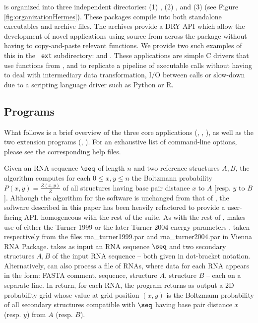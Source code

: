 \hermes is organized into three independent directories: (1)
\ffttwo, (2) \rnamfpt, and (3) \rnaeq (see
Figure \ref{fig:organizationHermes}). These packages compile into both
standalone executables and archive files. The archives provide a DRY
API which allow the development of novel applications using source
from across the \hermes package without having to copy-and-paste
relevant functions. We provide two such examples of this in the {\tt
ext} subdirectory: \fftmfpt and \ffteq. These applications
are simple C drivers that use functions from \ffttwo, \rnamfpt and
\rnaeq to replicate a pipeline of executable calls without having to
deal with intermediary data transformation, I/O between calls or
slow-down due to a scripting language driver such as Python or R.

\subsection{Programs}

What follows is a brief overview of the three core applications
(\ffttwo, \rnamfpt, \rnaeq), as well as the two extension
programs (\fftmfpt, \ffteq). For an exhaustive list of
command-line options, please see the corresponding help files.

Given an RNA sequence $\seq$ of length $n$ and two reference
structures $A,B$, the algorithm \ffttwo \cite{Senter.jmb14}
computes for each $0 \leq x,y \leq n$ the Boltzmann probability
$P(x,y) = \frac{Z(x,y)}{Z}$ of all structures having base pair
distance $x$ to $A$ [resp. $y$ to $B$]. Although the algorithm for the
software \ffttwo is unchanged from that of \cite{Senter.jmb14},
the software described in this
paper has been heavily refactored to provide a user-facing API,
homogeneous with the rest of the \hermes suite. As with the rest of
\hermes, \ffttwo makes use of either the Turner 1999 \cite{turner}
or the later Turner 2004 energy parameters
\cite{Turner.nar10}, taken respectively
from the files rna\_turner1999.par and  rna\_turner2004.par in Vienna
RNA Package. \ffttwo takes as input an RNA sequence $\seq$ and two
secondary structures $A,B$ of the input RNA sequence -- both given
in dot-bracket
notation. Alternatively, \ffttwo can also process a file of RNAs,
where data for each RNA appears in the form: FASTA comment, sequence,
structure $A$, structure $B$ -- each on a separate line. In return,
for each RNA, the program returns as output a 2D probability grid
whose value at
grid position $(x,y)$ is the Boltzmann probability of all secondary
structures compatible with $\seq$ having base pair distance $x$ (resp.
$y$) from $A$ (resp. $B$).

